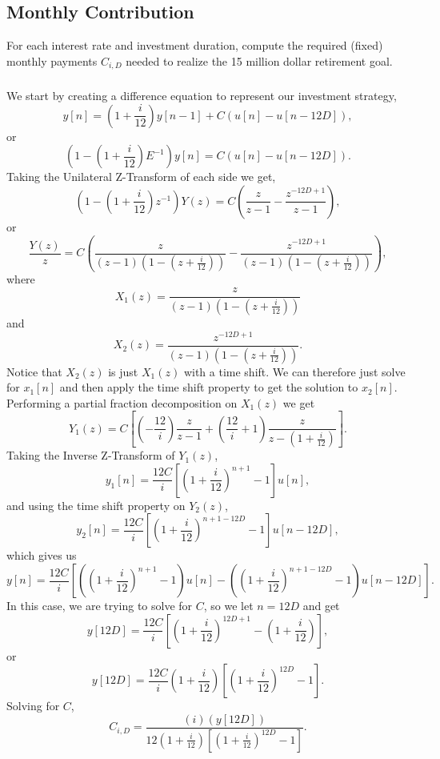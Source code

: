 \documentclass[letterpaper]{report}
\begin{document}
\subsection{Monthly Contribution}
For each interest rate and investment duration, compute the required (fixed) monthly payments $C_{i,D}$ needed to realize the 15 million dollar retirement goal.

\subsubsection{}
We start by creating a difference equation to represent our investment strategy,
\[
	y[n] = \left(1+\frac{i}{12}\right) y[n-1] + C(u[n] - u[n-12D]),
\]
or
\[
	\left(1 - \left(1+\frac{i}{12}\right)E^{-1}\right)y[n] = C(u[n] - u[n-12D]).
\]
Taking the Unilateral Z-Transform of each side we get,
\[
	\left(1 - \left(1+\frac{i}{12}\right)z^{-1}\right)Y(z) = 
	C \left(\frac{z}{z-1} - \frac{z^{-12D+1}}{z-1} \right),
\]
or
\[
	\frac{Y(z)}{z} = C \left(
	\frac{z}{\left(z-1\right)\left(1 - \left(z+\frac{i}{12}\right)\right)} 
	- \frac{z^{-12D+1}}{\left(z-1\right)\left(1 - \left(z+\frac{i}{12}\right)\right)} 
	\right),
\]
where
\[X_{1}(z) = \frac{z}{\left(z-1\right)\left(1 - \left(z+\frac{i}{12}\right)\right)}\]
and 
\[X_{2}(z) = \frac{z^{-12D+1}}{\left(z-1\right)\left(1 - \left(z+\frac{i}{12}\right)\right)}.\]
Notice that $X_{2}(z)$ is just $X_{1}(z)$ with a time shift. We can therefore just solve for $x_{1}[n]$ and then apply the time shift property to get the solution to $x_{2}[n]$. Performing a partial fraction decomposition on $X_{1}(z)$ we get 
\[
	Y_{1}(z) = C\left[\left(-\frac{12}{i} \right)\frac{z}{z-1} 
	+ \left(\frac{12}{i} + 1\right)\frac{z}{z-\left(1+\frac{i}{12}\right)} \right]. 
\]
Taking the Inverse Z-Transform of $Y_{1}(z)$,
\[
	y_{1}[n] = \frac{12C}{i} \left[\left(1+\frac{i}{12}\right)^{n+1} - 1 \right]u[n],
\]
and using the time shift property on $Y_{2}(z)$,
\[
	y_{2}[n] = \frac{12C}{i} \left[\left(1+\frac{i}{12}\right)^{n+1-12D} - 1 \right]u[n-12D],
\]
which gives us
\[
	y[n] = \frac{12C}{i} \left[\left(\left(1+\frac{i}{12}\right)^{n+1} - 1\right) u[n]
    - \left(\left(1+\frac{i}{12}\right)^{n+1-12D} - 1\right) u[n-12D] \right].
\]
In this case, we are trying to solve for $C$, so we let $n = 12D$ and get
\[
y[12D] = \frac{12C}{i} \left[\left(1+\frac{i}{12}\right)^{12D+1} 
- \left(1+\frac{i}{12}\right) \right],
\]
or
\[
y[12D] = \frac{12C}{i} \left(1+\frac{i}{12}\right) \left[\left(1+\frac{i}{12}\right)^{12D} 
- 1 \right].
\]
Solving for $C$,
\[
C_{i,D} = \frac{(i)(y[12D])}{12 \left(1+\frac{i}{12}\right) \left[\left(1+\frac{i}{12}\right)^{12D} 
	- 1 \right]}.
\]
\end{document}
